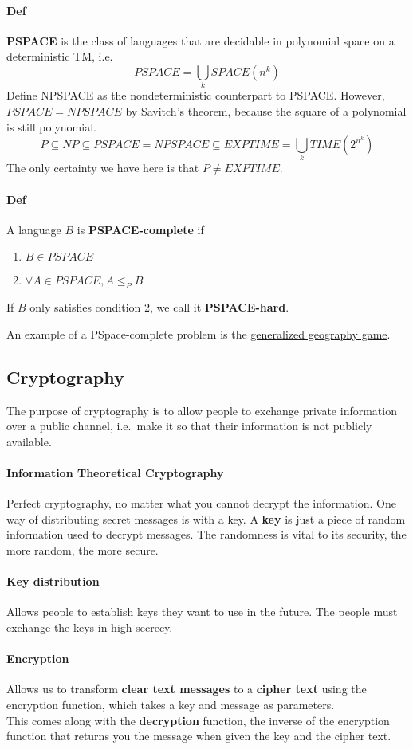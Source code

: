 \documentclass[12 pt]{article}
\begin{document}
\paragraph{Def} \textbf{PSPACE} is the class of languages that are
decidable in polynomial space on a deterministic TM, i.e.
$$PSPACE = \bigcup_k SPACE(n^k)$$
Define NPSPACE as the nondeterministic counterpart to PSPACE. However,
$PSPACE = NPSPACE$ by Savitch's theorem, because the square of a
polynomial is still polynomial.
$$P \subseteq NP \subseteq PSPACE = NPSPACE \subseteq EXPTIME =
\bigcup_k TIME(2^{n^k})$$
The only certainty we have here is that $P \neq EXPTIME$.
\paragraph{Def} A language $B$ is \textbf{PSPACE-complete} if
\begin{enumerate}
\item $B \in PSPACE$
\item $\forall A \in PSPACE, A \leq_P B$
\end{enumerate}
If $B$ only satisfies condition 2, we call it \textbf{PSPACE-hard}.

An example of a PSpace-complete problem is the
\hyperref[psp1]{generalized geography game}.
\subsection{Cryptography}
The purpose of cryptography is to allow people to exchange private
information over a public channel, i.e.\ make it so that their
information is not publicly available.
\paragraph{Information Theoretical Cryptography}
Perfect cryptography, no matter what you cannot decrypt the
information. One way of distributing secret messages is with a key. A
\textbf{key} is just a piece of random information used to decrypt
messages. The randomness is vital to its security, the more random,
the more secure.
\paragraph{Key distribution} Allows people to establish
keys they want to use in the future. The people must exchange the keys
in high secrecy.
\paragraph{Encryption} Allows us to transform \textbf{clear text
  messages} to a \textbf{cipher text} using the encryption function,
which takes a key and message as parameters.
\\ This comes along with the \textbf{decryption} function, the inverse
of the encryption function that returns you the message when given the
key and the cipher text.
\end{document}
